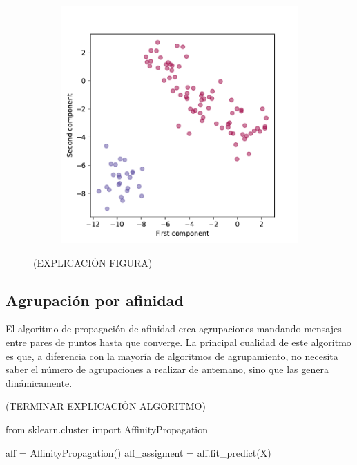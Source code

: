 \begin{figure}[h]
\begin{subfigure}{0.45\textwidth}
    \includegraphics[width=\textwidth]{figures/aglomerative-pca.pdf}
    \caption{}
    \label{fig:}
  \end{subfigure}
  \caption[Prueba del algoritmo aglomerativo.]{(EXPLICACIÓN FIGURA)}
  \label{fig:}
\end{figure}

\newpage
\subsection{Agrupación por afinidad}

El algoritmo de propagación de afinidad crea agrupaciones mandando mensajes entre pares de puntos hasta que converge. La principal cualidad de este algoritmo es que, a diferencia con la mayoría de algoritmos de agrupamiento, no necesita saber el número de agrupaciones a realizar de antemano, sino que las genera dinámicamente.

(TERMINAR EXPLICACIÓN ALGORITMO)

\begin{mypython}[float={h},caption={Propagación de afinidad.}]
  from sklearn.cluster import AffinityPropagation

  aff = AffinityPropagation()
  aff_assigment = aff.fit_predict(X)
\end{mypython}

